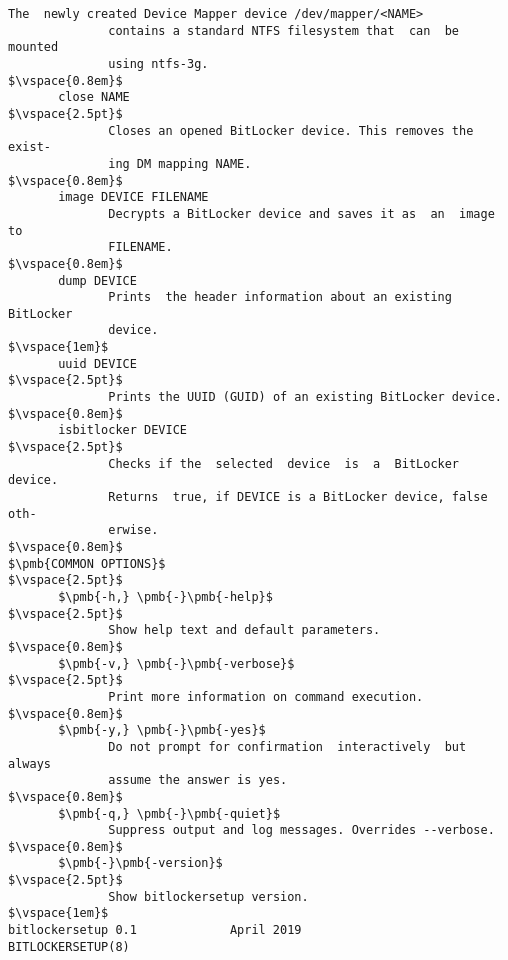 \begin{lstlisting}[frame=none, escapechar=$, columns=fullflexible, keepspaces=true, basicstyle=\ttfamily\small]
              The  newly created Device Mapper device /dev/mapper/<NAME>
              contains a standard NTFS filesystem that  can  be  mounted
              using ntfs-3g.
$\vspace{0.8em}$
       close NAME
$\vspace{2.5pt}$
              Closes an opened BitLocker device. This removes the exist-
              ing DM mapping NAME.
$\vspace{0.8em}$
       image DEVICE FILENAME
              Decrypts a BitLocker device and saves it as  an  image  to
              FILENAME.
$\vspace{0.8em}$
       dump DEVICE
              Prints  the header information about an existing BitLocker
              device.
$\vspace{1em}$
       uuid DEVICE
$\vspace{2.5pt}$
              Prints the UUID (GUID) of an existing BitLocker device.
$\vspace{0.8em}$
       isbitlocker DEVICE
$\vspace{2.5pt}$
              Checks if the  selected  device  is  a  BitLocker  device.
              Returns  true, if DEVICE is a BitLocker device, false oth-
              erwise.
$\vspace{0.8em}$
$\pmb{COMMON OPTIONS}$
$\vspace{2.5pt}$
       $\pmb{-h,} \pmb{-}\pmb{-help}$
$\vspace{2.5pt}$
              Show help text and default parameters.
$\vspace{0.8em}$
       $\pmb{-v,} \pmb{-}\pmb{-verbose}$
$\vspace{2.5pt}$
              Print more information on command execution.
$\vspace{0.8em}$
       $\pmb{-y,} \pmb{-}\pmb{-yes}$
              Do not prompt for confirmation  interactively  but  always
              assume the answer is yes.
$\vspace{0.8em}$
       $\pmb{-q,} \pmb{-}\pmb{-quiet}$
              Suppress output and log messages. Overrides --verbose.
$\vspace{0.8em}$
       $\pmb{-}\pmb{-version}$
$\vspace{2.5pt}$
              Show bitlockersetup version.
$\vspace{1em}$
bitlockersetup 0.1             April 2019              BITLOCKERSETUP(8)
\end{lstlisting}

\label{attachment:sources}

